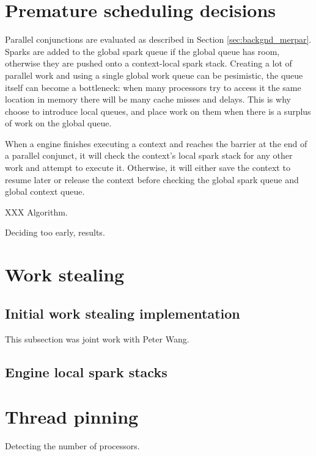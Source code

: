 

\section{Premature scheduling decisions}

Parallel conjunctions are evaluated as described in Section
\ref{sec:backgnd_merpar}.
Sparks are added to the global spark queue if the global queue has room,
otherwise they are pushed onto a context-local spark stack.
Creating a lot of parallel work and using a single global work queue can be
pesimistic,
the queue itself can become a bottleneck:
when many processors try to access it the same location in memory there will
be many cache misses and delays.
This is why \citet{wang_hons_thesis} choose to introduce local queues,
and place work on them when there is a surplus of work on the global queue.

When a engine finishes executing a context and reaches the barrier at the
end of a parallel conjunct,
it will check the context's local spark stack for any other work and attempt
to execute it.
Otherwise, it will either save the context to resume later or release the
context before checking the global spark queue and global context queue.

XXX Algorithm.

Deciding too early, results.


\section{Work stealing}

\subsection{Initial work stealing implementation}

This subsection was joint work with Peter Wang.

\subsection{Engine local spark stacks}

\section{Thread pinning}

Detecting the number of processors.

